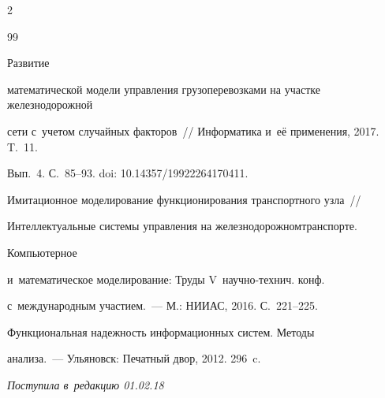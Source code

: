 \begin{multicols}{2}
{{\begin{thebibliography}{99}


 Развитие 


математической модели управления грузоперевозками на участке железнодорожной 


сети с~учетом случайных факторов~// Информатика и~её применения, 2017. T.~11. 


Вып.~4. С.~85--93. doi: 10.14357/19922264170411.







 Имитационное моделирование функционирования транспортного узла~// 


Интеллекту\-аль\-ные системы управления на железнодорожном\linebreak транспорте. 


Компьютерное 


и~математическое моделирование: Труды V~научно-технич. конф. 


с~международным участием.~--- М.: НИИАС, 2016. С.~221--225.




 Функциональная надежность информационных систем. Методы 


анализа.~--- Ульяновск: Печатный двор, 2012. 296~c.


 \end{thebibliography}





 }


 }





\end{multicols}





\vspace*{-4pt}





\hfill{\small\textit{Поступила в~редакцию 01.02.18}}





\vspace*{10pt}










